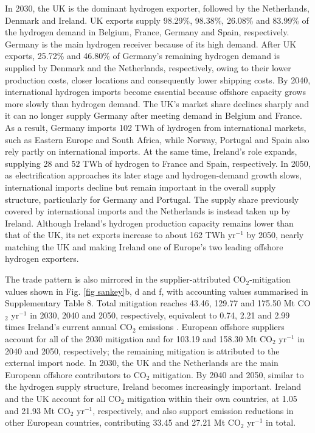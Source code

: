 \documentclass[pdflatex,sn-mathphys,Numbered]{sn-jnl}%
\begin{document}
In 2030, the UK is the dominant hydrogen exporter, followed by the Netherlands, Denmark and Ireland. UK exports supply 98.29\%, 98.38\%, 26.08\% and 83.99\% of the hydrogen demand in Belgium, France, Germany and Spain, respectively. Germany is the main hydrogen receiver because of its high demand. After UK exports, 25.72\% and 46.80\% of Germany's remaining hydrogen demand is supplied by Denmark and the Netherlands, respectively, owing to their lower production costs, closer locations and consequently lower shipping costs. By 2040, international hydrogen imports become essential because offshore capacity grows more slowly than hydrogen demand. The UK's market share declines sharply and it can no longer supply Germany after meeting demand in Belgium and France. As a result, Germany imports 102 TWh of hydrogen from international markets, such as Eastern Europe and South Africa, while Norway, Portugal and Spain also rely partly on international imports. At the same time, Ireland's role expands, supplying 28 and 52 TWh of hydrogen to France and Spain, respectively. In 2050, as electrification approaches its later stage and hydrogen-demand growth slows, international imports decline but remain important in the overall supply structure, particularly for Germany and Portugal. The supply share previously covered by international imports and the Netherlands is instead taken up by Ireland. Although Ireland's hydrogen production capacity remains lower than that of the UK, its net exports increase to about 162 TWh yr$^{-1}$ by 2050, nearly matching the UK and making Ireland one of Europe's two leading offshore hydrogen exporters.

The trade pattern is also mirrored in the supplier-attributed CO$_2$-mitigation values shown in Fig. \ref{fig sankey}b, d and f, with accounting values summarised in Supplementary Table 8. Total mitigation reaches 43.46, 129.77 and 175.50 Mt CO$_2$ yr$^{-1}$ in 2030, 2040 and 2050, respectively, equivalent to 0.74, 2.21 and 2.99 times Ireland's current annual CO$_2$ emissions \cite{COemissions}. European offshore suppliers account for all of the 2030 mitigation and for 103.19 and 158.30 Mt CO$_2$ yr$^{-1}$ in 2040 and 2050, respectively; the remaining mitigation is attributed to the external import node. In 2030, the UK and the Netherlands are the main European offshore contributors to CO$_2$ mitigation. By 2040 and 2050, similar to the hydrogen supply structure, Ireland becomes increasingly important. Ireland and the UK account for all CO$_2$ mitigation within their own countries, at 1.05 and 21.93 Mt CO$_2$ yr$^{-1}$, respectively, and also support emission reductions in other European countries, contributing 33.45 and 27.21 Mt CO$_2$ yr$^{-1}$ in total.
\end{document}
